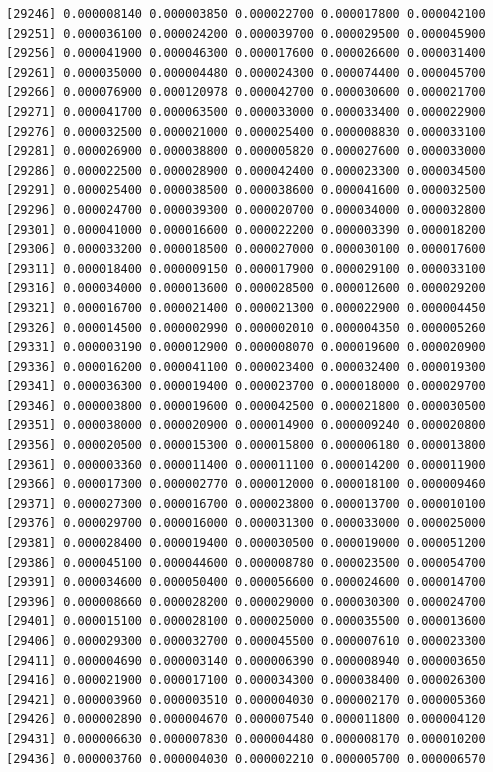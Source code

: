 \documentclass[]{article}
\begin{document}
\begin{verbatim}
[29246] 0.000008140 0.000003850 0.000022700 0.000017800 0.000042100
[29251] 0.000036100 0.000024200 0.000039700 0.000029500 0.000045900
[29256] 0.000041900 0.000046300 0.000017600 0.000026600 0.000031400
[29261] 0.000035000 0.000004480 0.000024300 0.000074400 0.000045700
[29266] 0.000076900 0.000120978 0.000042700 0.000030600 0.000021700
[29271] 0.000041700 0.000063500 0.000033000 0.000033400 0.000022900
[29276] 0.000032500 0.000021000 0.000025400 0.000008830 0.000033100
[29281] 0.000026900 0.000038800 0.000005820 0.000027600 0.000033000
[29286] 0.000022500 0.000028900 0.000042400 0.000023300 0.000034500
[29291] 0.000025400 0.000038500 0.000038600 0.000041600 0.000032500
[29296] 0.000024700 0.000039300 0.000020700 0.000034000 0.000032800
[29301] 0.000041000 0.000016600 0.000022200 0.000003390 0.000018200
[29306] 0.000033200 0.000018500 0.000027000 0.000030100 0.000017600
[29311] 0.000018400 0.000009150 0.000017900 0.000029100 0.000033100
[29316] 0.000034000 0.000013600 0.000028500 0.000012600 0.000029200
[29321] 0.000016700 0.000021400 0.000021300 0.000022900 0.000004450
[29326] 0.000014500 0.000002990 0.000002010 0.000004350 0.000005260
[29331] 0.000003190 0.000012900 0.000008070 0.000019600 0.000020900
[29336] 0.000016200 0.000041100 0.000023400 0.000032400 0.000019300
[29341] 0.000036300 0.000019400 0.000023700 0.000018000 0.000029700
[29346] 0.000003800 0.000019600 0.000042500 0.000021800 0.000030500
[29351] 0.000038000 0.000020900 0.000014900 0.000009240 0.000020800
[29356] 0.000020500 0.000015300 0.000015800 0.000006180 0.000013800
[29361] 0.000003360 0.000011400 0.000011100 0.000014200 0.000011900
[29366] 0.000017300 0.000002770 0.000012000 0.000018100 0.000009460
[29371] 0.000027300 0.000016700 0.000023800 0.000013700 0.000010100
[29376] 0.000029700 0.000016000 0.000031300 0.000033000 0.000025000
[29381] 0.000028400 0.000019400 0.000030500 0.000019000 0.000051200
[29386] 0.000045100 0.000044600 0.000008780 0.000023500 0.000054700
[29391] 0.000034600 0.000050400 0.000056600 0.000024600 0.000014700
[29396] 0.000008660 0.000028200 0.000029000 0.000030300 0.000024700
[29401] 0.000015100 0.000028100 0.000025000 0.000035500 0.000013600
[29406] 0.000029300 0.000032700 0.000045500 0.000007610 0.000023300
[29411] 0.000004690 0.000003140 0.000006390 0.000008940 0.000003650
[29416] 0.000021900 0.000017100 0.000034300 0.000038400 0.000026300
[29421] 0.000003960 0.000003510 0.000004030 0.000002170 0.000005360
[29426] 0.000002890 0.000004670 0.000007540 0.000011800 0.000004120
[29431] 0.000006630 0.000007830 0.000004480 0.000008170 0.000010200
[29436] 0.000003760 0.000004030 0.000002210 0.000005700 0.000006570

\end{verbatim}
\end{document}
